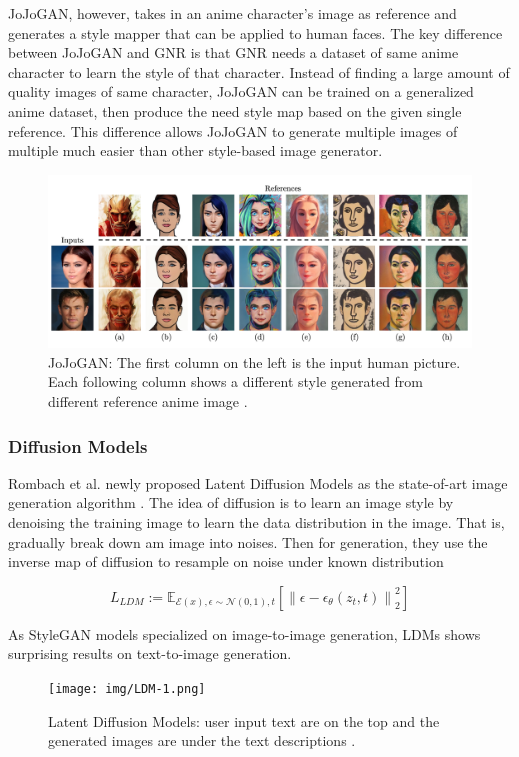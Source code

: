 JoJoGAN, however, takes in an anime character's image as reference and generates
a style mapper that can be applied to human faces.
The key difference between JoJoGAN and GNR is that GNR needs a dataset of same anime character to learn the style of that character.
Instead of finding a large amount of quality images of same character,
JoJoGAN can be trained on a generalized anime dataset,
then produce the need style map based on the given single reference.
This difference allows JoJoGAN to generate multiple images of multiple much easier than other style-based image generator.
\begin{figure}[h]
    \includegraphics[width=\textwidth]{img/JoJo-1.png}
    \caption{
        JoJoGAN: The first column on the left is the input human picture.
        Each following column shows a different style generated from different reference anime image \cite{chong2021jojogan}.
    }
\end{figure}

\subsubsection*{Diffusion Models}

Rombach et al. newly proposed Latent Diffusion Models as the state-of-art image generation algorithm \cite{Rombach2022High}.
The idea of diffusion is to learn an image style by denoising the training image to learn the data distribution in the image.
That is, gradually break down am image into noises.
Then for generation, they use the inverse map of diffusion to resample on noise under known distribution

$$
L_{L D M}:=\mathbb{E}_{\mathcal{E}(x), \epsilon \sim \mathcal{N}(0,1), t}\left[\left\|\epsilon-\epsilon_\theta\left(z_t, t\right)\right\|_2^2\right]
$$

As StyleGAN models specialized on image-to-image generation,
LDMs shows surprising results on text-to-image generation.
\begin{figure}[h]
    \texttt{[image: img/LDM-1.png]}
    \caption{
        Latent Diffusion Models:
        user input text are on the top
        and the generated images are under the text descriptions \cite{Rombach2022High}.
    }
\end{figure}

